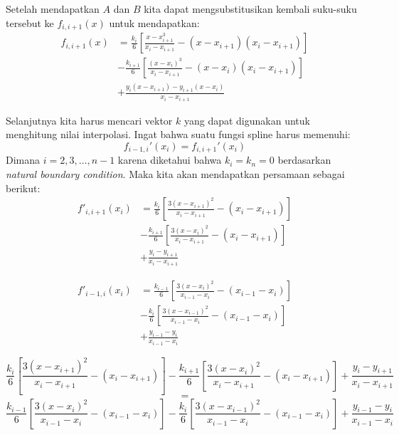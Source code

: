 \documentclass[journal,12pt,onecolumn,a4paper]{IEEEtran}
\begin{document}
Setelah mendapatkan \(A\) dan \(B\) kita dapat mengsubstitusikan kembali suku-suku tersebut ke \(f_{i, i+1}(x)\) untuk mendapatkan:
\begin{equation}
	\begin{split}
		f_{i, i+1}(x) & = \frac{k_i}{6}[\frac{x-x_{i+1}^3}{x_i-x_{i+1}} - (x - x_{i+1})(x_i - x_{i+1})]\\
		& - \frac{k_{i+1}}{6}[\frac{(x-x_i)^3}{x_i - x_{i+1}} - (x-x_i)(x_i - x_{i+1})]\\
		& + \frac{y_i(x-x_{i+1}) - y_{i+1}(x-x_i)}{x_i - x_{i+1}}
	\end{split}
\end{equation}

Selanjutnya kita harus mencari vektor \(k\) yang dapat digunakan untuk menghitung nilai interpolasi. Ingat bahwa suatu fungsi spline harus memenuhi:
\begin{equation*}
	f_{i-1, i}'(x_i) = f_{i, i+1}'(x_i)
\end{equation*}
Dimana \(i = 2, 3, \dots, n-1\) karena diketahui bahwa \(k_i = k_n = 0\) berdasarkan \emph{natural boundary condition}. Maka kita akan mendapatkan persamaan sebagai berikut:
\begin{equation*}
	\begin{split}
		f'_{i, i+1}(x_i) & = \frac{k_i}{6}[\frac{3(x-x_{i+1})^2}{x_i - x_{i+1}} - (x_i - x_{i+1})]\\
		& - \frac{k_{i+1}}{6}[\frac{3(x-x_i)^2}{x_i - x_{i+1}} - (x_i - x_{i+1})]\\
		& + \frac{y_i - y_{i+1}}{x_i - x_{i+1}}
	\end{split}
\end{equation*}

\begin{equation*}
	\begin{split}
		f'_{i-1, i}(x_i) & = \frac{k_{i-1}}{6}[\frac{3(x-x_{i})^2}{x_{i-1} - x_{i}} - (x_{i-1} - x_{i})]\\
		& - \frac{k_{i}}{6}[\frac{3(x-x_{i-1})^2}{x_{i-1} - x_{i}} - (x_{i-1} - x_{i})]\\
		& + \frac{y_{i-1} - y_{i}}{x_{i-1} - x_{i}}
	\end{split}
\end{equation*}

\begin{equation*}
	\frac{k_i}{6}[\frac{3(x-x_{i+1})^2}{x_i - x_{i+1}} - (x_i - x_{i+1})] - \frac{k_{i+1}}{6}[\frac{3(x-x_i)^2}{x_i - x_{i+1}} - (x_i - x_{i+1})] + \frac{y_i - y_{i+1}}{x_i - x_{i+1}}
\end{equation*}
\begin{equation*}
	=
\end{equation*}
\begin{equation*}
	\frac{k_{i-1}}{6}[\frac{3(x-x_{i})^2}{x_{i-1} - x_{i}} - (x_{i-1} - x_{i})] - \frac{k_{i}}{6}[\frac{3(x-x_{i-1})^2}{x_{i-1} - x_{i}} - (x_{i-1} - x_{i})] + \frac{y_{i-1} - y_{i}}{x_{i-1} - x_{i}}
\end{equation*}
\end{document}
